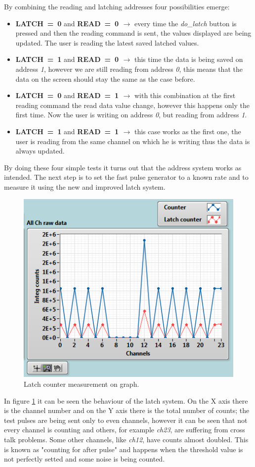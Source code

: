 By combining the reading and latching addresses four possibilities emerge:
\begin{itemize}
	\item \textbf{LATCH~=~0} and \textbf{READ~=~0 $\rightarrow$} every time the \textit{do\_latch} button is pressed and then the reading command is sent, the values displayed are being updated. The user is reading the latest saved latched values.
	\item \textbf{LATCH~=~1} and \textbf{READ~=~0 $\rightarrow$} this time the data is being saved on address \textit{1}, however we are still reading from address \textit{0}, this means that the data on the screen should stay the same as the case before.
	\item \textbf{LATCH~=~0} and \textbf{READ~=~1 $\rightarrow$} with this combination at the first reading command the read data value change, however this happens only the first time. Now the user is writing on address \textit{0}, but reading from address \textit{1}. 
	\item \textbf{LATCH~=~1} and \textbf{READ~=~1 $\rightarrow$} this case works as the first one, the user is reading from the same channel on which he is writing thus the data is always updated. 
\end{itemize}
\noindent By doing these four simple tests it turns out that the address system works as intended. The next step is to set the fast pulse generator to a known rate and to measure it using the new and improved latch system.
\begin{figure}[H]
	\centering
	\includegraphics[width=0.5\linewidth]{IMG/ch5/latch_tests/fig2.PNG}
	\caption{Latch counter measurement on graph.}
	\label{fig:latchfigure}
\end{figure}
\noindent In figure \ref{fig:latchfigure} it can be seen the behaviour of the latch system. On the X axis there is the channel number and on the Y axis there is the total number of counts; the test pulses are being sent only to even channels, however it can be seen that not every channel is counting and others, for example \textit{ch23}, are suffering from cross talk problems. Some other channels, like \textit{ch12}, have counts almost doubled. This is known as "counting for after pulse" and happens when the threshold value is not perfectly setted and some noise is being counted.
